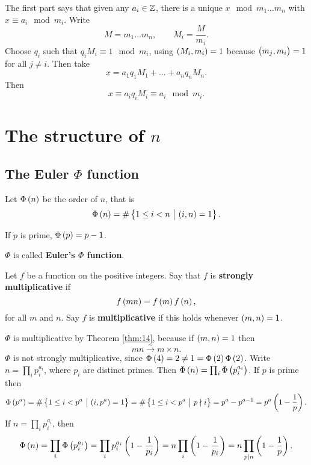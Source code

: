 The first part says that given any $ a_i \in \mathbb{Z} $, there is a unique $ x \mod m_1 \dots m_n $ with $ x \equiv a_i \mod m_i $. Write
$$ M = m_1 \dots m_n, \qquad M_i = \dfrac{M}{m_i}. $$
Choose $ q_i $ such that $ q_iM_i \equiv 1 \mod m_i $, using $ \br{M_i, m_i} = 1 $ because $ \br{m_j, m_i} = 1 $ for all $ j \ne i $. Then take
$$ x = a_1q_1M_1 + \dots + a_nq_nM_n. $$
Then
$$ x \equiv a_iq_iM_i \equiv a_i \mod m_i. $$

\pagebreak

\section{The structure of \texorpdfstring{$ \unit{n} $}{Z/nZ}}

\subsection{The Euler \texorpdfstring{$ \Phi $}{Phi} function}

Let $ \Phi\br{n} $ be the order of $ \unit{n} $, that is
$$ \Phi\br{n} = \#\cbr{1 \le i < n \st \br{i, n} = 1}. $$

\begin{example*}
If $ p $ is prime, $ \Phi\br{p} = p - 1 $.
\end{example*}

$ \Phi $ is called \textbf{Euler's $ \Phi $ function}.

\begin{definition}
Let $ f $ be a function on the positive integers. Say that $ f $ is \textbf{strongly multiplicative} if
$$ f\br{mn} = f\br{m}f\br{n}, $$
for all $ m $ and $ n $. Say $ f $ is \textbf{multiplicative} if this holds whenever $ \br{m, n} = 1 $.
\end{definition}

$ \Phi $ is multiplicative by Theorem \ref{thm:14}, because if $ \br{m, n} = 1 $ then
$$ \unit{mn} \xrightarrow{\sim} \unit{m} \times \unit{n}. $$
$ \Phi $ is not strongly multiplicative, since $ \Phi\br{4} = 2 \ne 1 = \Phi\br{2}\Phi\br{2} $. Write $ n = \prod_i p_i^{a_i} $, where $ p_i $ are distinct primes. Then $ \Phi\br{n} = \prod_i \Phi\br{p_i^{a_i}} $. If $ p $ is prime then
$$ \Phi\br{p^a} = \#\cbr{1 \le i < p^a \st \br{i, p^a} = 1} = \#\cbr{1 \le i < p^a \st p \nmid i} = p^a - p^{a - 1} = p^a\br{1 - \dfrac{1}{p}}. $$
If $ n = \prod_i p_i^{a_i} $, then
$$ \Phi\br{n} = \prod_i \Phi\br{p_i^{a_i}} = \prod_i p_i^{a_i}\br{1 - \dfrac{1}{p_i}} = n\prod_i \br{1 - \dfrac{1}{p_i}} = n\prod_{p \mid n} \br{1 - \dfrac{1}{p}}. $$

